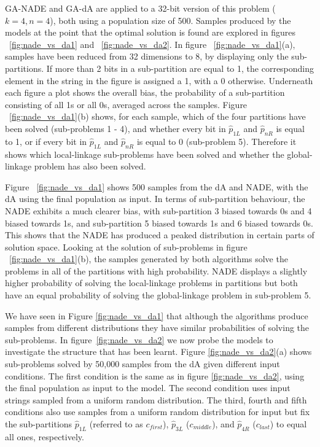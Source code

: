 \documentclass[twoside]{article}
\begin{document}
GA-NADE and GA-dA are applied to a 32-bit version of this problem (\(k=4,n=4\)), both using a population size of 500. Samples produced by the models at the point that the optimal solution is found are explored in figures ~\ref{fig:nade_vs_da1} and ~\ref{fig:nade_vs_da2}. In figure ~\ref{fig:nade_vs_da1}(a), samples have been reduced from 32 dimensions to 8, by displaying only the sub-partitions. If more than 2 bits in a sub-partition are equal to 1, the corresponding element in the string in the figure is assigned a 1, with a 0 otherwise. Underneath each figure a plot shows the overall bias, the probability of a sub-partition consisting of all 1s or all 0s, averaged across the samples. Figure ~\ref{fig:nade_vs_da1}(b) shows, for each sample, which of the four partitions have been solved (sub-problems 1 - 4), and whether every bit in \(\hat{p}_{1L}\) and \(\hat{p}_{nR}\) is equal to 1, or if every bit in \(\hat{p}_{1L}\) and \(\hat{p}_{nR}\) is equal to 0 (sub-problem 5). Therefore it shows which local-linkage sub-problems have been solved and whether the global-linkage problem has also been solved.

Figure ~\ref{fig:nade_vs_da1} shows 500 samples from the dA and NADE, with the dA using the final population as input. In terms of sub-partition behaviour, the NADE exhibits a much clearer bias, with sub-partition 3 biased towards 0s and 4 biased towards 1s, and sub-partition 5 biased towards 1s and 6 biased towards 0s. This shows that the NADE has produced a peaked distribution in certain parts of solution space. Looking at the solution of sub-problems in figure ~\ref{fig:nade_vs_da1}(b), the samples generated by both algorithms solve the problems in all of the partitions with high probability. NADE displays a slightly higher probability of solving the local-linkage problems in partitions but both have an equal probability of solving the global-linkage problem in sub-problem 5.

We have seen in Figure \ref{fig:nade_vs_da1} that although the algorithms produce samples from different distributions they have similar probabilities of solving the sub-problems. In figure~\ref{fig:nade_vs_da2} we now probe the models to investigate the structure that has been learnt. Figure \ref{fig:nade_vs_da2}(a) shows sub-problems solved by 50,000 samples from the dA given different input conditions. The first condition is the same as in figure \ref{fig:nade_vs_da2}, using the final population as input to the model. The second condition uses input strings sampled from a uniform random distribution. The third, fourth and fifth conditions also use samples from a uniform random distribution for input but fix the sub-partitions \(\hat{p}_{1L}\) (referred to as \(c_{first}\)),  \(\hat{p}_{3L}\) (\(c_{middle}\)), and \(\hat{p}_{4R}\) (\(c_{last}\)) to equal all ones, respectively.
\end{document}
